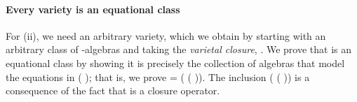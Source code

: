 \paragraph*{Every variety is an equational class}
For (ii), we need an arbitrary variety, which we obtain by starting with an arbitrary class
 of -algebras and taking the \emph{varietal closure},  .
We prove that   is an equational class by showing it is precisely the collection of
algebras that model the equations in  ( ); that is, we prove
  =  ( ( )).
The inclusion     ( ( )) is a
consequence of the fact that   is a closure operator.

\begin{code}%
\>[0]\<%
\\
\>[0]\AgdaSpace{}%
\AgdaModule{\AgdaUnderscore{}}\AgdaSpace{}%
\AgdaSymbol{(}\AgdaSpace{}%
\AgdaSymbol{:}\AgdaSpace{}%
\AgdaSymbol{(}\AgdaSpace{}%
\AgdaSpace{}%
\AgdaSymbol{)}\AgdaSpace{}%
\AgdaSymbol{(}\AgdaSpace{}%
\AgdaSpace{}%
\AgdaSpace{}%
\AgdaSpace{}%
\AgdaSpace{}%
\AgdaSymbol{))\{}\AgdaSpace{}%
\AgdaSymbol{:}\AgdaSpace{}%
\AgdaSpace{}%
\AgdaSymbol{(}\AgdaSpace{}%
\AgdaSpace{}%
\AgdaSpace{}%
\AgdaSpace{}%
\AgdaSymbol{)\}}\AgdaSpace{}%
\<%
\\
\>[0][@{}l@{\AgdaIndent{0}}]%
\>[1]\AgdaSpace{}%
\AgdaSpace{}%
\AgdaSymbol{=}\AgdaSpace{}%
\AgdaSpace{}%
\AgdaSpace{}%
\AgdaSpace{}%
\AgdaSpace{}%
\AgdaSpace{}%
\AgdaSymbol{;}\AgdaSpace{}%
\AgdaSpace{}%
\AgdaSymbol{=}\AgdaSpace{}%
\AgdaSpace{}%
\<%
\\
%
\>[1]\AgdaSpace{}%
\AgdaSymbol{:}\AgdaSpace{}%
\AgdaSymbol{\{}\AgdaSpace{}%
\AgdaSymbol{=}\AgdaSpace{}%
\AgdaSymbol{\}\{}\AgdaSymbol{\}\{}\AgdaSymbol{\}\{}\AgdaSymbol{\}\{}\AgdaSymbol{\}\{}\AgdaSymbol{\}}\AgdaSpace{}%

\end{code}
